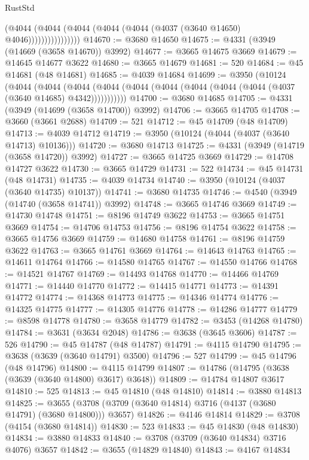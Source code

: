 \begin{lexlean}{RustStd}
\begin{coremodule}
                        (@4044
                          (@4044 (@4044 (@4044 (@4044 (@4037 (@3640 @14650) @4046))))))))))))))))
@14670 := @3680 @14650
@14675 := @4331 (@3949 (@14669 (@3658 @14670)) @3992)
@14677 := @3665 @14675 @3669
@14679 := @14645 @14677 @3622
@14680 := @3665 @14679
@14681 := 520
@14684 := @45 @14681 (@48 @14681)
@14685 := @4039 @14684
@14699 := @3950
    (@10124
      (@4044
        (@4044
          (@4044 (@4044 (@4044 (@4044 (@4044 (@4044 (@4044 (@4037 (@3640 @14685) @4342)))))))))))
@14700 := @3680 @14685
@14705 := @4331 (@3949 (@14699 (@3658 @14700)) @3992)
@14706 := @3665 @14705
@14708 := @3660 (@3661 @2688)
@14709 := 521
@14712 := @45 @14709 (@48 @14709)
@14713 := @4039 @14712
@14719 := @3950 (@10124 (@4044 (@4037 (@3640 @14713) @10136)))
@14720 := @3680 @14713
@14725 := @4331 (@3949 (@14719 (@3658 @14720)) @3992)
@14727 := @3665 @14725 @3669
@14729 := @14708 @14727 @3622
@14730 := @3665 @14729
@14731 := 522
@14734 := @45 @14731 (@48 @14731)
@14735 := @4039 @14734
@14740 := @3950 (@10124 (@4037 (@3640 @14735) @10137))
@14741 := @3680 @14735
@14746 := @4540 (@3949 (@14740 (@3658 @14741)) @3992)
@14748 := @3665 @14746 @3669
@14749 := @14730 @14748
@14751 := @8196 @14749 @3622
@14753 := @3665 @14751 @3669
@14754 := @14706 @14753
@14756 := @8196 @14754 @3622
@14758 := @3665 @14756 @3669
@14759 := @14680 @14758
@14761 := @8196 @14759 @3622
@14763 := @3665 @14761 @3669
@14764 := @14643 @14763
@14765 := @14611 @14764
@14766 := @14580 @14765
@14767 := @14550 @14766
@14768 := @14521 @14767
@14769 := @14493 @14768
@14770 := @14466 @14769
@14771 := @14440 @14770
@14772 := @14415 @14771
@14773 := @14391 @14772
@14774 := @14368 @14773
@14775 := @14346 @14774
@14776 := @14325 @14775
@14777 := @14305 @14776
@14778 := @14286 @14777
@14779 := @8598 @14778
@14780 := @3658 @14779
@14782 := @3453 (@14268 @14780)
@14784 := @3631 (@3634 @2048)
@14786 := @3638 (@3645 @3606)
@14787 := 526
@14790 := @45 @14787 (@48 @14787)
@14791 := @4115 @14790
@14795 := @3638 (@3639 (@3640 @14791) @3500)
@14796 := 527
@14799 := @45 @14796 (@48 @14796)
@14800 := @4115 @14799
@14807 := @14786 (@14795 (@3638 (@3639 (@3640 @14800) @3617) @3648))
@14809 := @14784 @14807 @3617
@14810 := 525
@14813 := @45 @14810 (@48 @14810)
@14814 := @3880 @14813
@14825 := @3655 (@3708 (@3709 (@3640 @14814) @3716 (@4137 (@3680 @14791) (@3680 @14800))) @3657)
@14826 := @4146 @14814
@14829 := @3708 (@4154 (@3680 @14814))
@14830 := 523
@14833 := @45 @14830 (@48 @14830)
@14834 := @3880 @14833
@14840 := @3708 (@3709 (@3640 @14834) @3716 @4076) @3657
@14842 := @3655 (@14829 @14840)
@14843 := @4167 @14834

\end{coremodule}
\end{lexlean}

